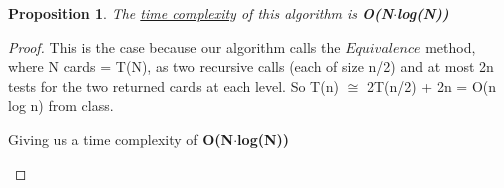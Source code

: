 \documentclass[12pt]{article}
\newtheorem{proposition}[theorem]{Proposition}
\begin{document}
\begin{proposition}
\label{numq}
The \underline{time complexity} of this algorithm is \textbf{O(N$\cdot$log(N))}
\end{proposition}

\begin{proof}
This is the case because our algorithm calls the $Equivalence$ method,
where N cards = T(N), as two recursive calls (each of size n/2) and
at most 2n tests for the two returned cards at each level. So T(n)
$\cong$ 2T(n/2) + 2n = O(n log n) from class.
\begin{center}
    Giving us a time complexity of \textbf{O(N$\cdot$log(N))}
\end{center}
\end{proof}



\end{document}
